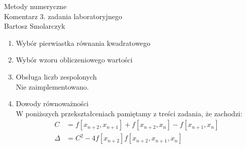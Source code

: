 \documentclass[12pt]{article}
\newcommand{\0}{x_{n}}
\newcommand{\1}{x_{n+1}}
\newcommand{\2}{x_{n+2}}
\newcommand{\3}{x_{n+3}}
\begin{document}
\begin{center}
	{\Huge Metody numeryczne}\\[7pt]
	Komentarz 3. zadania laboratoryjnego\\
	Bartosz Smolarczyk
\end{center}
\begin{enumerate}[1.]
\large\bf\item Wybór pierwiastka równania kwadratowego \boldsymbol{$\3$} \\
\normalfont


\large\bf\item Wybór wzoru obliczeniowego wartości \boldsymbol{$\3$} \\
\normalfont


\large\bf\item Obsługa liczb zespolonych \smallskip \\
\normalfont
\normalsize
Nie zaimplementowano.

\large\bf\item Dowody równoważności \smallskip \\
\normalfont
\normalsize
W poniższych przekształceniach pamiętamy z treści \mbox{zadania}, że zachodzi:
\begin{align*}
C &= f[\2, \1] + f[\2, \0] - f[\1, \0] \\[1ex]
\Delta &= C^2 - 4f[\2]f[\2, \1, \0]
\end{align*}
\begin{enumerate}[$\bullet$]


\end{enumerate}
\end{enumerate}
\end{document}
